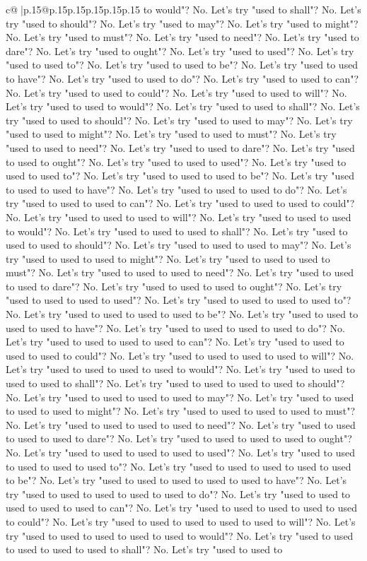 \documentclass{article}
\begin{document}
{\begin{supertabular}{c@{$\;$}|p{.15\linewidth}@{}p{.15\linewidth}p{.15\linewidth}p{.15\linewidth}p{.15\linewidth}p{.15\linewidth}}
{{{to would"? No. Let's try "used to shall"? No. Let's try "used to should"? No. Let's try "used to may"? No. Let's try "used to might"? No. Let's try "used to must"? No. Let's try "used to need"? No. Let's try "used to dare"? No. Let's try "used to ought"? No. Let's try "used to used"? No. Let's try "used to used to"? No. Let's try "used to used to be"? No. Let's try "used to used to have"? No. Let's try "used to used to do"? No. Let's try "used to used to can"? No. Let's try "used to used to could"? No. Let's try "used to used to will"? No. Let's try "used to used to would"? No. Let's try "used to used to shall"? No. Let's try "used to used to should"? No. Let's try "used to used to may"? No. Let's try "used to used to might"? No. Let's try "used to used to must"? No. Let's try "used to used to need"? No. Let's try "used to used to dare"? No. Let's try "used to used to ought"? No. Let's try "used to used to used"? No. Let's try "used to used to used to"? No. Let's try "used to used to used to be"? No. Let's try "used to used to used to have"? No. Let's try "used to used to used to do"? No. Let's try "used to used to used to can"? No. Let's try "used to used to used to could"? No. Let's try "used to used to used to will"? No. Let's try "used to used to used to would"? No. Let's try "used to used to used to shall"? No. Let's try "used to used to used to should"? No. Let's try "used to used to used to may"? No. Let's try "used to used to used to might"? No. Let's try "used to used to used to must"? No. Let's try "used to used to used to need"? No. Let's try "used to used to used to dare"? No. Let's try "used to used to used to ought"? No. Let's try "used to used to used to used"? No. Let's try "used to used to used to used to"? No. Let's try "used to used to used to used to be"? No. Let's try "used to used to used to used to have"? No. Let's try "used to used to used to used to do"? No. Let's try "used to used to used to used to can"? No. Let's try "used to used to used to used to could"? No. Let's try "used to used to used to used to will"? No. Let's try "used to used to used to used to would"? No. Let's try "used to used to used to used to shall"? No. Let's try "used to used to used to used to should"? No. Let's try "used to used to used to used to may"? No. Let's try "used to used to used to used to might"? No. Let's try "used to used to used to used to must"? No. Let's try "used to used to used to used to need"? No. Let's try "used to used to used to used to dare"? No. Let's try "used to used to used to used to ought"? No. Let's try "used to used to used to used to used"? No. Let's try "used to used to used to used to used to"? No. Let's try "used to used to used to used to used to be"? No. Let's try "used to used to used to used to used to have"? No. Let's try "used to used to used to used to used to do"? No. Let's try "used to used to used to used to used to can"? No. Let's try "used to used to used to used to used to could"? No. Let's try "used to used to used to used to used to will"? No. Let's try "used to used to used to used to used to would"? No. Let's try "used to used to used to used to used to shall"? No. Let's try "used to used to }}}
\end{supertabular}}
\end{document}
